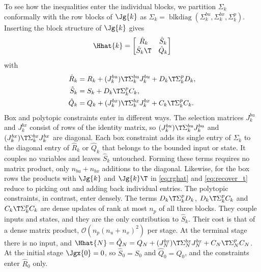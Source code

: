 To see how the inequalities enter the individual blocks, we partition $\Sigma_k$ conformally with the row blocks of $\Jg{k}$ as $\Sigma_k = \operatorname{blkdiag}(\Sigma_k^{bu}, \Sigma_k^{bx}, \Sigma_k^{p})$.
Inserting the block structure of $\Jg{k}$ gives
\[
    \Hhat{k} = \begin{bmatrix} \hat{R}_k & \hat{S}_k \\ \hat{S}_k\T & \hat{Q}_k \end{bmatrix}
\]
with
\begin{align*}
    \hat{R}_k &= R_k + (J_k^{bu})\T\Sigma_k^{bu}J_k^{bu} + D_k\T\Sigma_k^{p}D_k , \\
    \hat{S}_k &= S_k + D_k\T\Sigma_k^{p}C_k , \\
    \hat{Q}_k &= Q_k + (J_k^{bx})\T\Sigma_k^{bx}J_k^{bx} + C_k\T\Sigma_k^{p}C_k .
\end{align*}
Box and polytopic constraints enter in different ways.
The selection matrices $J_k^{bu}$ and $J_k^{bx}$ consist of rows of the identity matrix, so $(J_k^{bu})\T\Sigma_k^{bu}J_k^{bu}$ and $(J_k^{bx})\T\Sigma_k^{bx}J_k^{bx}$ are diagonal.
Each box constraint adds its single entry of $\Sigma_k$ to the diagonal entry of $\hat{R}_k$ or $\hat{Q}_k$ that belongs to the bounded input or state.
It couples no variables and leaves $\hat{S}_k$ untouched.
Forming these terms requires no matrix product, only $n_{bu} + n_{bx}$ additions to the diagonal.
Likewise, for the box rows the products with $\Jg{k}$ and $\Jg{k}\T$ in \eqref{eq:rghat} and \eqref{eq:recover_t} reduce to picking out and adding back individual entries.
The polytopic constraints, in contrast, enter densely.
The terms $D_k\T\Sigma_k^{p}D_k$, $D_k\T\Sigma_k^{p}C_k$ and $C_k\T\Sigma_k^{p}C_k$ are dense updates of rank at most $n_p$ of all three blocks.
They couple inputs and states, and they are the only contribution to $\hat{S}_k$.
Their cost is that of a dense matrix product, $\mathcal{O}\!\left(n_p (n_u + n_x)^2\right)$ per stage.
At the terminal stage there is no input, and $\Hhat{N} = \hat{Q}_N = Q_N + (J_N^{bx})\T\Sigma_N^{bx}J_N^{bx} + C_N\T\Sigma_N^{p}C_N$.
At the initial stage $\Jgx{0} = 0$, so $\hat{S}_0 = S_0$ and $\hat{Q}_0 = Q_0$, and the constraints enter $\hat{R}_0$ only.

